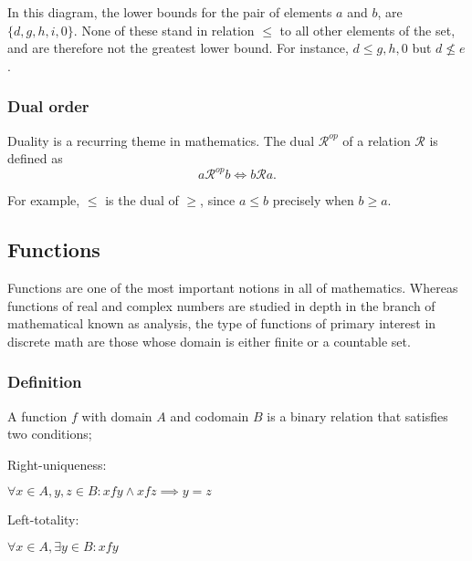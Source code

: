 \documentclass[11pt]{article}
\theoremstyle{plain}
\theoremstyle{definition}
\newenvironment{packed_enum}{
\begin{enumerate}
  \setlength{\itemsep}{1pt}
  \setlength{\parskip}{0pt}
  \setlength{\parsep}{0pt}
}{\end{enumerate}}
\begin{document}
\begin{center}
  \def\svgwidth{0.3\columnwidth}
  
\end{center}

\noindent In this diagram, the lower bounds for the pair of elements $ a $ and $ b $, are $ \{ d, g, h, i, 0 \} $. None of these stand in relation $ \le $ to all other elements of the set, and are therefore not the greatest lower bound. For instance, $ d \le g, h, 0 $ but $ d \not \le e $. 

\subsubsection*{Dual order}

Duality is a recurring theme in mathematics. The dual $ \mathcal{R}^{op} $ of a relation $ \mathcal{R} $ is defined as
$$
  a \mathcal{R}^{op} b \iff b \mathcal{R} a.
$$

\noindent For example, $ \le $ is the dual of $ \ge $, since $ a \le b $ precisely when $ b \ge a $.

\subsection*{Functions}

Functions are one of the most important notions in all of mathematics. Whereas functions of real and complex numbers are studied in depth in the branch of mathematical known as analysis, 
the type of functions of primary interest in discrete math are those whose domain is either finite or a countable set. 

\subsubsection*{Definition}

A function $ f $ with domain $ A $ and codomain $ B $ is a binary relation that satisfies two conditions; 

\begin{packed_enum}
  \item \begin{em}Right-uniqueness:\end{em} $ \forall x \in A, y, z \in B : x f y \wedge x f z \implies y = z $
  \item \begin{em}Left-totality:\end{em} $ \forall x \in A, \exists y \in B : x f y $
\end{packed_enum}
\end{document}
